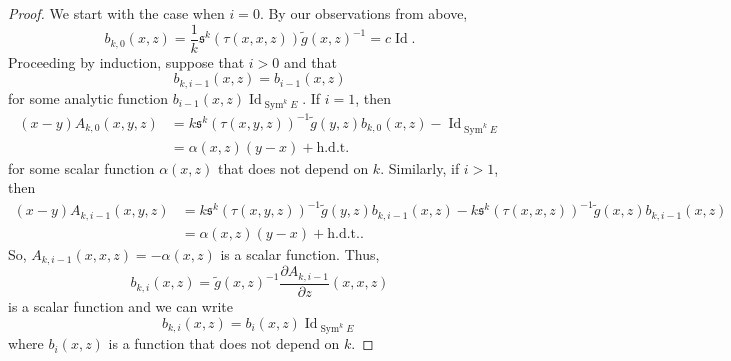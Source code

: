 \documentclass{amsart}
\theoremstyle{definition}
\theoremstyle{remark}
\numberwithin{equation}{section}
\newcommand{\deriv}[2]{\frac{\partial #1}{\partial #2}}
\DeclareMathOperator{\Sym}{Sym}
\DeclareMathOperator{\Id}{Id}
\begin{document}
\begin{proof}
We start with the case when $i = 0$. By our observations from above,
\begin{equation*}
    b_{k,0}(x,z)  = \frac{1}{k} \mathfrak{s}^k(\tau(x,x,z)) \tilde{g}(x,z)^{-1} = c  \Id.
\end{equation*}
Proceeding by induction, suppose that $i > 0$ and that \begin{equation*}
    b_{k,i-1} (x,z) = b_{i-1}(x,z)
\end{equation*}
for some analytic function $b_{i-1}(x,z) \Id_{\Sym^k E}$. If $i = 1$, then
\begin{equation*}
\begin{split}
    (x-y)A_{k,0}(x,y,z) & = k \mathfrak{s}^k(\tau(x,y,z))^{-1} \tilde{g}(y,z) b_{k,0}(x,z) - \Id_{\Sym^k E}  \\
    & = \alpha(x,z) (y-x) + \text{h.d.t.}
\end{split}
\end{equation*}
for some scalar function $\alpha(x,z)$ that does not depend on $k$. Similarly, if $i > 1$, then
\begin{equation*}
\begin{split}
    (x-y) A_{k,i-1}(x,y,z) & = k \mathfrak{s}^k(\tau(x,y,z))^{-1} \tilde{g}(y,z) b_{k,i-1}(x,z)  -  k \mathfrak{s}^k(\tau(x,x,z))^{-1} \tilde{g}(x,z) b_{k,i-1}(x,z)\\
    & = \alpha(x,z) (y-x) + \text{h.d.t.}.
\end{split}
\end{equation*}
So, $A_{k,i-1}(x,x,z) = -\alpha(x,z)$ is a scalar function. Thus,
\begin{equation*}
b_{k,i}(x,z) = \tilde{g}(x,z)^{-1} \deriv{A_{k,i-1}}{z}(x,x,z)
\end{equation*}
is a scalar function and we can write
$$
b_{k,i}(x,z) = b_i(x,z) \Id_{\Sym^k E}
$$
where $b_i(x,z)$ is a function that does not depend on $k$.


\end{proof}
\end{document}
